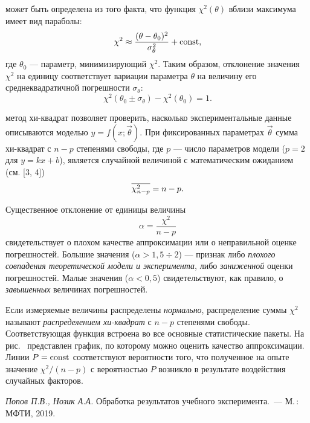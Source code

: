 \begin{booksupplement}
\begin{description}[font=\mdseries\sffamily]
        
    \item[Погрешность параметра апроксимации $\sigma_{\theta}$]
    может быть определена из того факта, что функция $\chi^2(\theta)$ 
    вблизи максимума имеет вид параболы:
    \[
    \chi^2 \approx \frac{(\theta - \theta_0)^2}{\sigma_{\theta}^2} + \mathrm{const},
    \]
    где $\theta_0$ --- параметр, минимизирующий $\chi^2$.
    Таким образом, отклонение значения $\chi^2$ на единицу соответствует
    вариации параметра $\theta$ на величину его среднеквадратичной погрешности 
    $\sigma_{\theta}$:
    \[
    \chi^2(\theta_0 \pm \sigma_{\theta}) - \chi^2(\theta_0) = 1.
    \]
    \item[Проверка качества аппроксимации:] метод хи-квадрат позволяет
    проверить, насколько экспериментальные данные описываются
    моделью $y=f(x;\vec{\theta})$. 
    При фиксированных параметрах $\vec{\theta}$ 
    сумма хи-квадрат с $n-p$ степенями свободы,
    где $p$ --- число параметров модели ($p=2$ для $y=kx+b$),
    является случайной величиной с математическим
    ожиданием (см. [3, 4])
    \begin{equation*}\eqmark{chi2-np}
    \overline{\chi^2_{n-p}} = n - p.
    \end{equation*}
    
    Существенное отклонение от единицы величины 
    \[
     \alpha = \frac{\chi^2}{n-p}
    \] 
 свидетельствует о плохом качестве аппроксимации 
 или о неправильной оценке погрешностей.
    Большие значения ($\alpha >1,5 \div 2$) --- признак либо \emph{плохого совпадения теоретической
    модели и эксперимента}, либо \emph{заниженной} оценки погрешностей.
    Малые значения ($\alpha <0,5$) свидетельствуют, как правило, о
    \emph{завышенных} величинах погрешностей.
    
    Если измеряемые величины распределены \emph{нормально}, распределение суммы
    $\chi^2$ называют \emph{распределением хи-квадрат} с $n-p$ степенями
    свободы. Соответствующая функция встроена во все основные 
    статистические пакеты. На рис.~ представлен график, 
    по которому     можно оценить качество аппроксимации. Линии 
    $P=\mathrm{const}$ соответствуют вероятности того, что 
    полученное на опыте значение $\chi^2/(n-p)$ с вероятностью $P$ 
    возникло в результате воздействия случайных факторов.
  
    
\end{description}

\begin{lab:literature}
    \item \textit{Попов П.В., Нозик А.А.} Обработка результатов
    учебного эксперимента.~--- М.\,: МФТИ, 2019.


\end{lab:literature}
\end{booksupplement}
